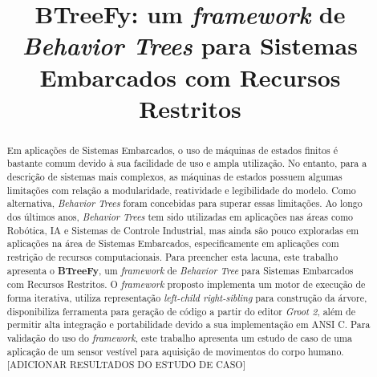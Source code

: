 \documentclass[conference]{IEEEtran}
\begin{document}
\title{BTreeFy: um \textit{framework} de \textit{Behavior Trees} para Sistemas Embarcados com Recursos Restritos}

\author{
\and
{}
\and
{}
}

\maketitle

\begin{abstract}
Em aplicações de Sistemas Embarcados, o uso de máquinas de estados finitos é bastante comum devido à sua facilidade de uso e ampla utilização. No entanto, para a descrição de sistemas mais complexos, as máquinas de estados possuem algumas limitações com relação a modularidade, reatividade e legibilidade do modelo. Como alternativa, \textit{Behavior Trees} foram concebidas para superar essas limitações. Ao longo dos últimos anos, \textit{Behavior Trees} tem sido utilizadas em aplicações nas áreas como Robótica, IA e Sistemas de Controle Industrial, mas ainda são pouco exploradas em aplicações na área de Sistemas Embarcados, especificamente em aplicações com restrição de recursos computacionais. Para preencher esta lacuna, este trabalho apresenta o \textbf{BTreeFy}, um \textit{framework} de \textit{Behavior Tree} para Sistemas Embarcados com Recursos Restritos. O \textit{framework} proposto implementa um motor de execução de forma iterativa, utiliza representação \textit{left-child right-sibling} para construção da árvore, disponibiliza ferramenta para geração de código a partir do editor \textit{Groot 2}, além de permitir alta integração e portabilidade devido a sua implementação em ANSI C. Para validação do uso do \textit{framework}, este trabalho apresenta um estudo de caso de uma aplicação de um sensor vestível para aquisição de movimentos do corpo humano. [ADICIONAR RESULTADOS DO ESTUDO DE CASO]
\end{abstract}
\end{document}
